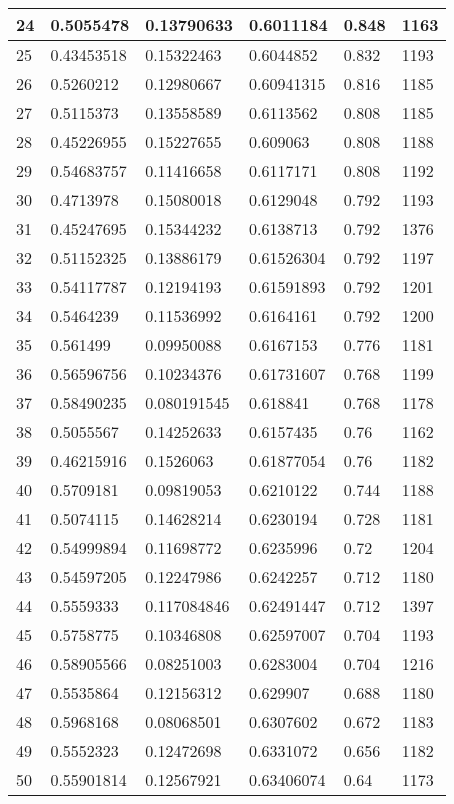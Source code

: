 \begin{longtable}{|l|l|l|l|l|l|}
24 & 0.5055478 & 0.13790633 & 0.6011184 & 0.848 & 1163 \\ \hline 
25 & 0.43453518 & 0.15322463 & 0.6044852 & 0.832 & 1193 \\ \hline 
26 & 0.5260212 & 0.12980667 & 0.60941315 & 0.816 & 1185 \\ \hline 
27 & 0.5115373 & 0.13558589 & 0.6113562 & 0.808 & 1185 \\ \hline 
28 & 0.45226955 & 0.15227655 & 0.609063 & 0.808 & 1188 \\ \hline 
29 & 0.54683757 & 0.11416658 & 0.6117171 & 0.808 & 1192 \\ \hline 
30 & 0.4713978 & 0.15080018 & 0.6129048 & 0.792 & 1193 \\ \hline 
31 & 0.45247695 & 0.15344232 & 0.6138713 & 0.792 & 1376 \\ \hline 
32 & 0.51152325 & 0.13886179 & 0.61526304 & 0.792 & 1197 \\ \hline 
33 & 0.54117787 & 0.12194193 & 0.61591893 & 0.792 & 1201 \\ \hline 
34 & 0.5464239 & 0.11536992 & 0.6164161 & 0.792 & 1200 \\ \hline 
35 & 0.561499 & 0.09950088 & 0.6167153 & 0.776 & 1181 \\ \hline 
36 & 0.56596756 & 0.10234376 & 0.61731607 & 0.768 & 1199 \\ \hline 
37 & 0.58490235 & 0.080191545 & 0.618841 & 0.768 & 1178 \\ \hline 
38 & 0.5055567 & 0.14252633 & 0.6157435 & 0.76 & 1162 \\ \hline 
39 & 0.46215916 & 0.1526063 & 0.61877054 & 0.76 & 1182 \\ \hline 
40 & 0.5709181 & 0.09819053 & 0.6210122 & 0.744 & 1188 \\ \hline 
41 & 0.5074115 & 0.14628214 & 0.6230194 & 0.728 & 1181 \\ \hline 
42 & 0.54999894 & 0.11698772 & 0.6235996 & 0.72 & 1204 \\ \hline 
43 & 0.54597205 & 0.12247986 & 0.6242257 & 0.712 & 1180 \\ \hline 
44 & 0.5559333 & 0.117084846 & 0.62491447 & 0.712 & 1397 \\ \hline 
45 & 0.5758775 & 0.10346808 & 0.62597007 & 0.704 & 1193 \\ \hline 
46 & 0.58905566 & 0.08251003 & 0.6283004 & 0.704 & 1216 \\ \hline 
47 & 0.5535864 & 0.12156312 & 0.629907 & 0.688 & 1180 \\ \hline 
48 & 0.5968168 & 0.08068501 & 0.6307602 & 0.672 & 1183 \\ \hline 
49 & 0.5552323 & 0.12472698 & 0.6331072 & 0.656 & 1182 \\ \hline 
50 & 0.55901814 & 0.12567921 & 0.63406074 & 0.64 & 1173 \\ \hline 
\end{longtable}